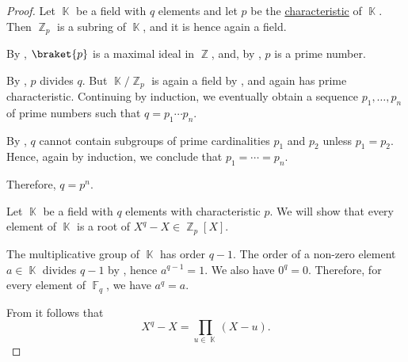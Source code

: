 \begin{proof}
   Let \( \BbbK \) be a field with \( q \) elements and let \( p \) be the \hyperref[def:ring_characteristic]{characteristic} of \( \BbbK \). Then \( \BbbZ_p \) is a subring of \( \BbbK \), and it is hence again a field.

  By , \( \braket{ p } \) is a maximal ideal in \( \BbbZ \), and, by , \( p \) is a prime number.

  By , \( p \) divides \( q \). But \( \BbbK / \BbbZ_p \) is again a field by , and again has prime characteristic. Continuing by induction, we eventually obtain a sequence \( p_1, \ldots, p_n \) of prime numbers such that \( q = p_1 \cdots p_n \).

  By , \( q \) cannot contain subgroups of prime cardinalities \( p_1 \) and \( p_2 \) unless \( p_1 = p_2 \). Hence, again by induction, we conclude that \( p_1 = \cdots = p_n \).

  Therefore, \( q = p^n \).

   Let \( \BbbK \) be a field with \( q \) elements with characteristic \( p \). We will show that every element of \( \BbbK \) is a root of \( X^q - X \in \BbbZ_p[X] \).

  The multiplicative group of \( \BbbK \) has order \( q - 1 \). The order of a non-zero element \( a \in \BbbK \) divides \( q - 1 \) by , hence \( a^{q - 1} = 1 \). We also have \( 0^q = 0 \). Therefore, for every element of \( \BbbF_q \), we have \( a^q = a \).

  From  it follows that
  \begin{equation*}
    X^q - X = \prod_{u \in \BbbK} (X - u).
  \end{equation*}
\end{proof}

